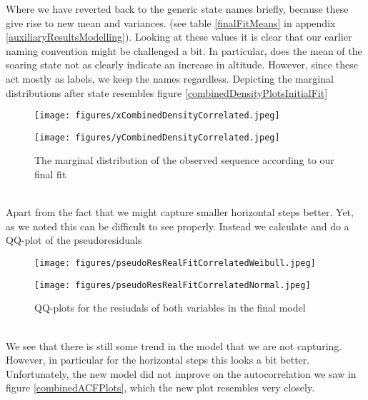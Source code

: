 Where we have reverted back to the generic state names briefly, because these give rise to new mean and variances. (see table \ref{finalFitMeans} in appendix \ref{auxiliaryResultsModelling}). Looking at these values it is clear that our earlier naming convention might be challenged a bit. In particular, does the mean of the soaring state not as clearly indicate an increase in altitude.  However, since these act mostly as labels, we keep the names regardless. Depicting the marginal distributions after state resembles figure \ref{combinedDensityPlotsInitialFit}
\begin{figure}[h]
  \centering
  \begin{minipage}[b]{0.49\textwidth}
    \texttt{[image: figures/xCombinedDensityCorrelated.jpeg]}
  \end{minipage}
  \hfill
  \begin{minipage}[b]{0.49\textwidth}
    \texttt{[image: figures/yCombinedDensityCorrelated.jpeg]}
  \end{minipage}
  \caption{The marginal distribution of the observed sequence according to our final fit}
  \label{combinedDensityPlotsFinalFit}
\end{figure}\\
Apart from the fact that we might capture smaller horizontal steps better. Yet, as we noted this can be difficult to see properly. Instead we calculate and do a QQ-plot of the pseudoresiduals
\begin{figure}[h]
  \centering
  \begin{minipage}[b]{0.49\textwidth}
    \texttt{[image: figures/pseudoResRealFitCorrelatedWeibull.jpeg]}
  \end{minipage}
  \hfill
  \begin{minipage}[b]{0.49\textwidth}
    \texttt{[image: figures/pseudoResRealFitCorrelatedNormal.jpeg]}
  \end{minipage}
  \caption{QQ-plots for the resiudals of both variables in the final model}
  \label{combinedQQPlotsFinal}
\end{figure}\\
We see that there is still some trend in the model that we are not capturing. However, in particular for the horizontal steps this looks a bit better. Unfortunately, the new model did not improve on the autocorrelation  we saw in figure \ref{combinedACFPlots}, which the new plot resembles very closely.
